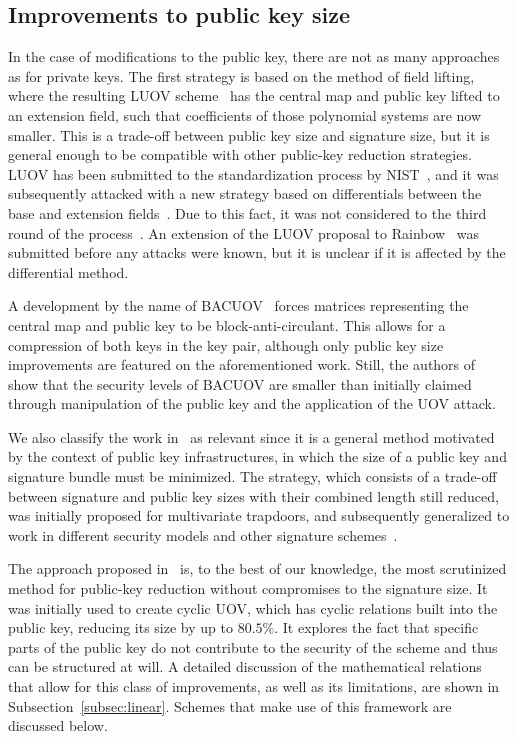 \documentclass[12pt, a4paper, oneside]{memoir}
\theoremstyle{definition}
\begin{document}
\subsection{Improvements to public key size}\label{subsec:pub}

In the case of modifications to the public key, there are not as many approaches as for private keys. The first strategy is based on the method of field lifting, where the resulting LUOV scheme~\cite{Beullens:201712} has the central map and public key lifted to an extension field, such that coefficients of those polynomial systems are now smaller. This is a trade-off between public key size and signature size, but it is general enough to be compatible with other public-key reduction strategies. LUOV has been submitted to the standardization process by NIST~\cite{Alagic:201901}, and it was subsequently attacked with a new strategy based on differentials between the base and extension fields~\cite{Ding:201912}. Due to this fact, it was not considered to the third round of the process~\cite[Sec.~3.24]{Alagic:202007}. An extension of the LUOV proposal to Rainbow~\cite{Duong:202003} was submitted before any attacks were known, but it is unclear if it is affected by the differential method.

A development by the name of BACUOV~\cite{Szepieniec:201908} forces matrices representing the central map and public key to be block-anti-circulant. This allows for a compression of both keys in the key pair, although only public key size improvements are featured on the aforementioned work. Still, the authors of~\cite{Furue:202004} show that the security levels of BACUOV are smaller than initially claimed through manipulation of the public key and the application of the UOV attack.

We also classify the work in~\cite{Szepieniec:201706} as relevant since it is a general method motivated by the context of public key infrastructures, in which the size of a public key and signature bundle must be minimized. The strategy, which consists of a trade-off between signature and public key sizes with their combined length still reduced, was initially proposed for multivariate trapdoors, and subsequently generalized to work in different security models and other signature schemes~\cite{Beullens:201808}.

The approach proposed in~\cite{Petzoldt:201006} is, to the best of our knowledge, the most scrutinized method for public-key reduction without compromises to the signature size. It was initially used to create cyclic UOV, which has cyclic relations built into the public key, reducing its size by up to $80.5\%$. It explores the fact that specific parts of the public key do not contribute to the security of the scheme and thus can be structured at will. A detailed discussion of the mathematical relations that allow for this class of improvements, as well as its limitations, are shown in Subsection~\ref{subsec:linear}. Schemes that make use of this framework are discussed below. 
\end{document}
